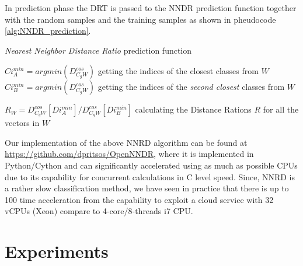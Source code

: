 \documentclass[runningheads]{llncs}
\begin{document}
In prediction phase the DRT is passed to the NNDR prediction function together with the random samples and the training samples as shown in pheudocode \ref{alg:NNDR_prediction}.

\begin{algorithm}[H]
\caption{\textit{Nearest Neighbor Distance Ratio} prediction function}\label{alg:NNDR_prediction}


$Ci^{min}_{A} = argmin(D^{cos}_{C_{g}W})$ getting the indices of the closest classes from $W$\;
$Ci^{min}_{B} = argmin(D^{cos}_{C_{g}W})$ getting the indices of the \textit{second closest} classes from $W$\;

$R_{W} = D^{cos}_{C_{g}W}[Di^{min}_{A}] / D^{cos}_{C_{g}W}[Di^{min}_{B}]$ calculating the Distance Rations $R$ for all the vectors in $W$


\end{algorithm}

Our implementation of the above NNRD algorithm can be found at \url{https://github.com/dpritsos/OpenNNDR}, where it is implemented in Python/Cython and can significantly accelerated using as much as possible CPUs due to its capability for concurrent calculations in C level speed. Since, NNRD is a rather slow classification method, we have seen in practice that there is up to 100 time acceleration from the capability to exploit a cloud service with 32 vCPUs (Xeon) compare to 4-core/8-threads i7 CPU.

\section{Experiments}\label{sec:experimental_setup}
\end{document}
